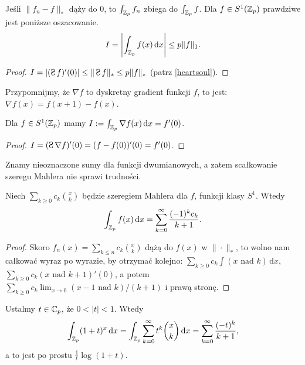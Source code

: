
\begin{fakt}
	Jeśli $\|f_n - f\|_* $ dąży do $0$, to $\int_{\mathbb Z_p} f_n$ zbiega do $\int_{\mathbb Z_p} f$.
	Dla $f \in S^1(\mathbb Z_p)$ prawdziwe jest poniższe oszacowanie.
	\[
		I = \left | \int_{\mathbb Z_p} f(x)\,\textrm{d}x \right| \le p \| f\|_1.
	\]
\end{fakt}

\begin{proof}
	$I = |(\suma f)'(0)| \le \|\suma f\|_* \le p \|f\|_*$ (patrz \ref{heartsoul}).
\end{proof}

Przypomnijmy, że $\nabla f$ to dyskretny gradient funkcji $f$, to jest: $\nabla f(x) = f(x+1) - f(x)$.

\begin{fakt} \label{festniemalsauf}
	Dla $f \in S^1(\mathbb Z_p)$ mamy $I := \int_{\mathbb Z_p} \nabla f(x) \,\textrm{d}x = f'(0)$.
\end{fakt}

\begin{proof}
	$I = (\suma \nabla f)'(0) = (f - f(0))'(0) = f'(0)$.
\end{proof}

Znamy nieoznaczone sumy dla funkcji dwumianowych, a zatem scałkowanie szeregu Mahlera nie sprawi trudności.

\begin{fakt}
	Niech  $\sum_{k\ge0} c_k {x \choose k}$ będzie szeregiem Mahlera dla $f$, funkcji klasy $S^1$.
	Wtedy
	\[
		\int_{\mathbb Z_p} f(x) \,\textrm{d}x = \sum_{k = 0}^\infty \frac{(-1)^kc_k}{k+1}.
	\]
\end{fakt}

\begin{proof}
	Skoro $f_n(x) = \sum_{k\le n} c_k {x \choose k}$ dążą do $f(x)$ w $\|\cdot\|_*$, to wolno nam całkować wyraz po wyrazie, by otrzymać kolejno: $\sum_{k \ge 0} c_k \int (x \mbox{ nad } k) \,\textrm{d}x$, $\sum_{k \ge 0} c_k (x \mbox{ nad } k+1)'(0)$, a potem $\sum_{k \ge 0} c_k \lim_{x \to 0} (x-1 \mbox{ nad }k) / (k+1)$ i prawą stronę.
\end{proof}

\begin{przyklad}
	Ustalmy $t \in \mathbb C_p$, że $0 < |t| < 1$.
	Wtedy
	\[
		\int_{\Z_p} (1+t)^x \,\textrm{d}x =
		\int_{\Z_p} \sum_{k=0}^\infty t^k {x \choose k} \,\textrm{d}x = 
		\sum_{k=0}^\infty \frac{(-t)^k}{k+1},%
	\]
	a to jest po prostu $\frac 1 t \log (1+t)$.
\end{przyklad}


